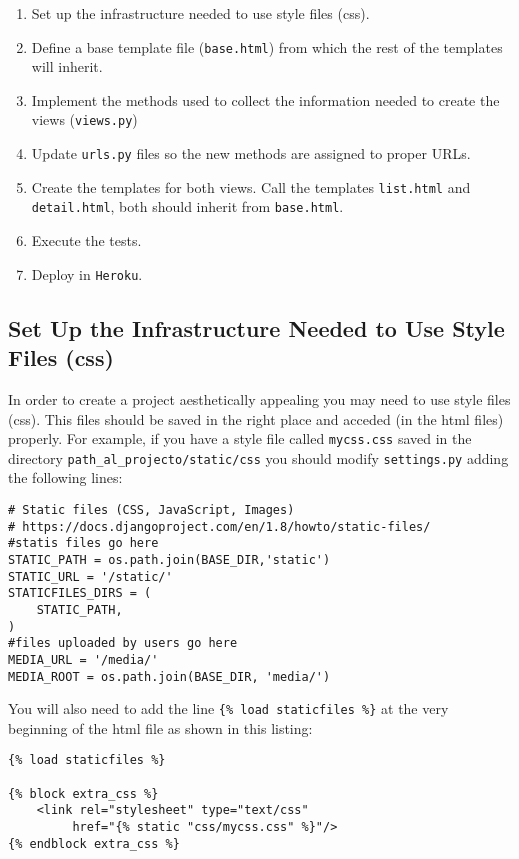 \documentclass[12pt]{article} %
\newcommand{\ttt}[1]{\texttt{#1}}%
\newcommand{\hhh}[1]{\texttt{#1}}%
\newcommand{\views}{\texttt{views.py}}%
\newcommand{\settings}{\texttt{settings.py}}%
\newcommand{\urls}{\texttt{urls.py}}%
\newcommand{\heroku}{\texttt{Heroku}}
\begin{document}
\begin{enumerate}
 \item Set up the infrastructure needed to use style files (css).
 \item Define a base template file (\hhh{base.html}) from which the rest of the templates will inherit.
 \item Implement the methods used to collect the information needed to create the views (\views)
 \item Update \urls{} files so the new methods are assigned to proper URLs.
 \item Create the templates for both views. Call the templates \hhh{list.html} and \hhh{detail.html}, both should inherit from \hhh{base.html}.
 \item Execute the  tests.
 \item Deploy in \heroku.
\end{enumerate}

\subsection{Set Up the Infrastructure Needed to Use Style Files (css)}

In order to create a project aesthetically appealing you may need to use style files (css). This files should be saved in the right place and acceded (in the html files) properly. For example, if you have a style file called  \ttt{mycss.css} saved in the directory \texttt{path\_al\_projecto/static/css} you should modify \settings{} adding the following lines:

\begin{lstlisting}[label={settings}]
# Static files (CSS, JavaScript, Images)
# https://docs.djangoproject.com/en/1.8/howto/static-files/
#statis files go here
STATIC_PATH = os.path.join(BASE_DIR,'static')
STATIC_URL = '/static/'
STATICFILES_DIRS = (
    STATIC_PATH,
)
#files uploaded by users go here
MEDIA_URL = '/media/'
MEDIA_ROOT = os.path.join(BASE_DIR, 'media/')

\end{lstlisting}

You will also need to add the line \texttt{\{\% load  staticfiles \%\}} at the very beginning of the html file as shown in this listing:

\begin{lstlisting}
{% load staticfiles %}

{% block extra_css %}
    <link rel="stylesheet" type="text/css" 
         href="{% static "css/mycss.css" %}"/>
{% endblock extra_css %}
\end{lstlisting}
\end{document}
